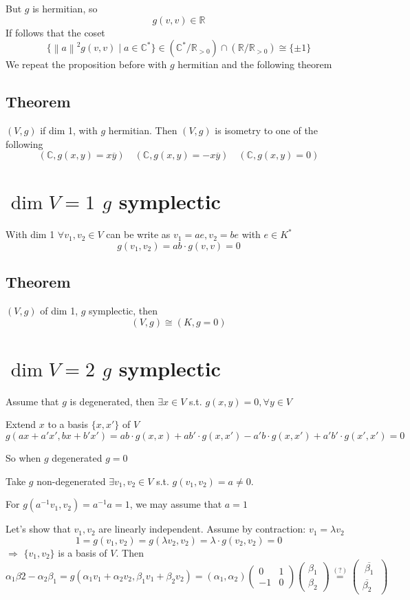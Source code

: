 \documentclass{book}
\newcommand{\norm}[1]{\left\lVert #1 \right\rVert}
\begin{document}
But $g$ is hermitian, so$$g(v,v)\in \mathbb{R}$$
If follows that the coset $$\{\norm{a}^2g(v,v)\mid a\in  \mathbb{C}^*\}\in (\mathbb{C}^*/\mathbb{R}_{>0})\cap(\mathbb{R}/\mathbb{R}_{>0})\cong\{\pm1\}$$
We repeat the proposition before with $g$ hermitian and the following theorem
\subsection{Theorem} $(V,g)$ if dim 1, with $g$ hermitian. Then $(V,g)$ is isometry to one of the following
$$(\mathbb{C},g(x,y)=x\overline{y})\quad(\mathbb{C},g(x,y)=-x\overline{y})\quad(\mathbb{C},g(x,y)=0)$$
\section{$\dim V=1$ $g$ symplectic}
With dim 1 $\forall v_1,v_2\in V$ can be write as $v_1=ae,v_2=be$ with $e\in K^*$$$g(v_1,v_2)=ab\cdot g(v,v)=0$$
\subsection{Theorem}$(V,g)$ of dim 1, $g$ symplectic, then $$(V,g)\cong(K,g=0)$$
\section{$\dim V=2$ $g$ symplectic}
Assume that $g$ is degenerated, then $\exists x\in V$ s.t. $g(x,y)=0,\forall y\in V$

Extend $x$ to a basis $\{x,x'\}$ of $V$
$$g(ax+a'x',bx+b'x')=ab\cdot g(x,x)+ab'\cdot g(x,x')-a'b\cdot g(x,x')+a'b'\cdot g(x',x')=0$$

So when $g$ degenerated $g=0$


Take $g$ non-degenerated $\exists v_1,v_2\in V$ s.t. $g(v_1,v_2)=a\neq0$. 

For $g(a^{-1}v_1,v_2)=a^{-1}a=1$, we may assume that $a=1$

Let's show that $v_1,v_2$ are linearly independent. Assume by contraction: $v_1=\lambda v_2$
$$1=g(v_1,v_2)=g(\lambda v_2,v_2)=\lambda\cdot g(v_2,v_2)=0$$
$\Rightarrow$ $\{v_1,v_2\}$ is a basis of $V$. Then
$$\alpha_1\beta2-\alpha_2\beta_1=g(\alpha_1v_1+\alpha_2v_2,\beta_1v_1+\beta_2v_2)=(\alpha_1,\alpha_2)\begin{pmatrix}
    0 &1\\-1&0
\end{pmatrix}\begin{pmatrix}
    \beta_1\\\beta_2
\end{pmatrix}\stackrel{(?)}{=}\begin{pmatrix}
    \ \overline{\beta_1}\ \\\overline{\beta_2}
\end{pmatrix}$$
\end{document}
